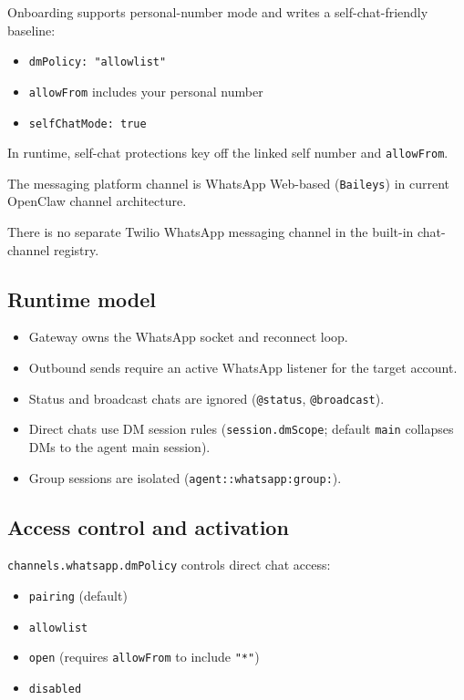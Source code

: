 Onboarding supports personal-number mode and writes a self-chat-friendly baseline:

\begin{itemize}
  \item \texttt{dmPolicy: "allowlist"}
  \item \texttt{allowFrom} includes your personal number
  \item \texttt{selfChatMode: true}
\end{itemize}


In runtime, self-chat protections key off the linked self number and \texttt{allowFrom}.


The messaging platform channel is WhatsApp Web-based (\texttt{Baileys}) in current OpenClaw channel architecture.

There is no separate Twilio WhatsApp messaging channel in the built-in chat-channel registry.


\subsection{Runtime model}


\begin{itemize}
  \item Gateway owns the WhatsApp socket and reconnect loop.
  \item Outbound sends require an active WhatsApp listener for the target account.
  \item Status and broadcast chats are ignored (\texttt{@status}, \texttt{@broadcast}).
  \item Direct chats use DM session rules (\texttt{session.dmScope}; default \texttt{main} collapses DMs to the agent main session).
  \item Group sessions are isolated (\texttt{agent::whatsapp:group:}).
\end{itemize}


\subsection{Access control and activation}


\texttt{channels.whatsapp.dmPolicy} controls direct chat access:

\begin{itemize}
  \item \texttt{pairing} (default)
  \item \texttt{allowlist}
  \item \texttt{open} (requires \texttt{allowFrom} to include \texttt{"*"})
  \item \texttt{disabled}
\end{itemize}


